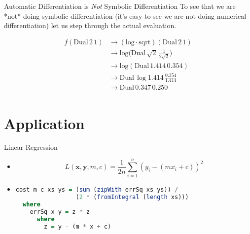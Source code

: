 \documentclass{beamer}
\begin{document}
\begin{frame}[fragile]{Automatic Differentiation is {\em Not} Symbolic
    Differentiation}
To see that we are *not* doing symbolic differentiation (it's easy to
see we are not doing numerical differentiation) let us step
through the actual evaluation.

$$
\begin{aligned}
f (\mathrm{Dual}\,2\,1) &\longrightarrow (\mathrm{log} \cdot \mathrm{sqrt}) (\mathrm{Dual}\,2\,1) \\
&\longrightarrow \mathrm{log} \bigg(\mathrm{Dual}\,\sqrt{2}\,\frac{1}{2\sqrt{2}}\bigg) \\
&\longrightarrow  \mathrm{log} (\mathrm{Dual}\,1.414\,0.354) \\
&\longrightarrow \mathrm{Dual}\,\log{1.414}\,\frac{0.354}{1.414} \\
&\longrightarrow \mathrm{Dual}\,0.347\,0.250\\
\end{aligned}
$$
\end{frame}

\section{Application}

\begin{frame}[fragile]{Linear Regression}
\begin{itemize}
\item
$$
L(\boldsymbol{x}, \boldsymbol{y}, m, c) = \frac{1}{2n}\sum_{i=1}^n (y_i - (mx_i + c))^2
$$

\pause
\item
\begin{scriptsize}
\begin{lstlisting}[language=Haskell]
cost m c xs ys = (sum (zipWith errSq xs ys)) /
                 (2 * (fromIntegral (length xs)))
  where
    errSq x y = z * z
      where
        z = y - (m * x + c)
\end{lstlisting}
\end{scriptsize}
\end{itemize}
\end{frame}
\end{document}

